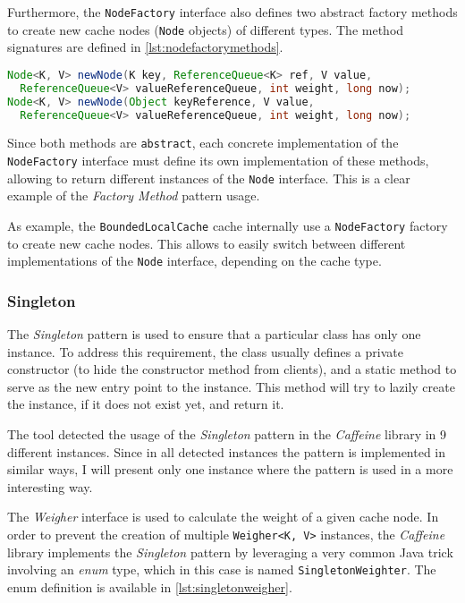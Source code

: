 \noindent Furthermore, the \texttt{NodeFactory} interface also defines two abstract factory methods to create new cache nodes (\texttt{Node} objects) of different types. The method signatures are defined in \autoref{lst:nodefactorymethods}.

\begin{lstlisting}[language=Java, caption={\texttt{NodeFactory} abstract factory methods to create \texttt{Node<K,V>} objects}, captionpos=b, label={lst:nodefactorymethods}]
Node<K, V> newNode(K key, ReferenceQueue<K> ref, V value,
  ReferenceQueue<V> valueReferenceQueue, int weight, long now);
Node<K, V> newNode(Object keyReference, V value,
  ReferenceQueue<V> valueReferenceQueue, int weight, long now);
\end{lstlisting}

\noindent Since both methods are \texttt{abstract}, each concrete implementation of the \texttt{NodeFactory} interface must define its own implementation of these methods, allowing to return different instances of the \texttt{Node} interface. This is a clear example of the \textit{Factory Method} pattern usage.

As example, the \texttt{BoundedLocalCache} cache internally use a \texttt{NodeFactory} factory to create new cache nodes. This allows to easily switch between different implementations of the \texttt{Node} interface, depending on the cache type.

\subsubsection{Singleton}
\label{sec:singleton}

The \textit{Singleton} pattern is used to ensure that a particular class has only one instance. To address this requirement, the class usually defines a private constructor (to hide the constructor method from clients), and a static method to serve as the new entry point to the instance. This method will try to lazily create the instance, if it does not exist yet, and return it.

The tool detected the usage of the \textit{Singleton} pattern in the \textit{Caffeine} library in 9 different instances. Since in all detected instances the pattern is implemented in similar ways, I will present only one instance where the pattern is used in a more interesting way.

The \textit{Weigher} interface is used to calculate the weight of a given cache node. In order to prevent the creation of multiple \texttt{Weigher<K, V>} instances, the \textit{Caffeine} library implements the \textit{Singleton} pattern by leveraging a very common Java trick involving an \textit{enum} type, which in this case is named \texttt{SingletonWeighter}. The enum definition is available in \autoref{lst:singletonweigher}.

